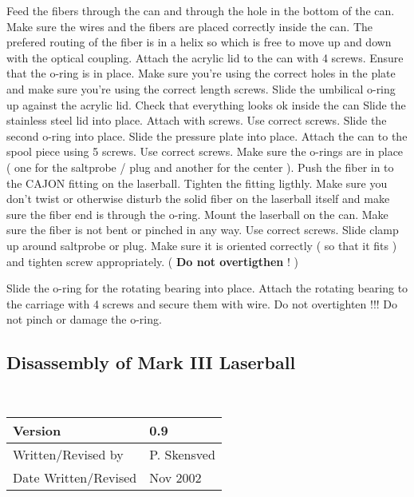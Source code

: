 \begin{enumerate}
\checkitem Feed the fibers through the can and through the hole in the bottom of the can.
\checkitem Make sure the wires and the fibers are placed correctly inside the can. The prefered
routing of the fiber is in a helix so which is free to move up and down with the optical
coupling.
\checkitem Attach the acrylic lid to the can with 4 screws. Ensure that the o-ring is in place.
Make sure you're using the correct holes in the plate and make sure you're using the correct
length  screws.
\checkitem Slide the umbilical o-ring up against the acrylic lid.
\checkitem Check that everything looks ok inside the can
\checkitem Slide the stainless steel lid into place. Attach with screws. Use correct screws.
\checkitem Slide the second o-ring into place.
\checkitem Slide the pressure plate into place.
\checkitem Attach the can to the spool piece using 5 screws. Use correct screws.
\checkitem Make sure the o-rings  are in place ( one for the saltprobe / plug
and another for the center ).
\checkitem Push the fiber in to the CAJON  fitting on the laserball. Tighten the fitting ligthly. 
Make sure you don't twist or otherwise disturb the solid fiber on the laserball itself and make sure the fiber end is through
the o-ring.
\checkitem Mount the laserball on the can. Make sure the fiber is not bent or pinched
in any way. Use correct screws.
\checkitem Slide clamp up around saltprobe or plug. Make sure it is oriented correctly ( so that it fits ) and
tighten screw appropriately. ( {\bf Do not overtigthen  } ! )

\checkitem Slide the o-ring for the rotating bearing into place.
\checkitem Attach the rotating bearing to the carriage with 4 screws and secure them
with wire. Do not overtighten !!!  Do not pinch or damage the o-ring.


\end{enumerate}



\newpage
\subsection{Disassembly of Mark III Laserball}
~\\
\noindent
\begin{tabular}{|l|l|}
\hline
Version              & 0.9 \\
\hline
Written/Revised by   & P. Skensved \\
\hline
Date Written/Revised & Nov 2002\\
\hline
\end{tabular}
 
